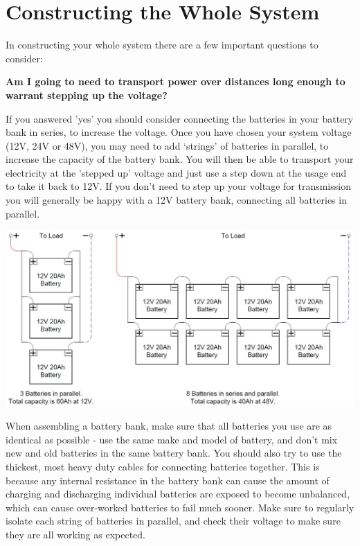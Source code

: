\documentclass{article}
\theoremstyle{definition}
\theoremstyle{definition}
\theoremstyle{remark}
\begin{document}


{\color{blue}\section{Constructing the Whole System}} %
\label{sec:constructing_the_whole_system}

  In constructing your whole system there are a few important questions to consider:

  \textbf{Am I going to need to transport power over distances long enough to warrant stepping up the voltage?}

  If you answered 'yes' you should consider connecting the batteries in your battery bank in series, to increase the voltage. Once you have chosen your system voltage (12V, 24V or 48V), you may need to add ‘strings’ of batteries in parallel, to increase the capacity of the battery bank. You will then be able to transport your electricity at the 'stepped up' voltage and just use a step down at the usage end to take it back to 12V. If you don't need to step up your voltage for transmission you will generally be happy with a 12V battery bank, connecting all batteries in parallel.

  \begin{center}
    \includegraphics[width=0.75\paperwidth]{Images/image_13_1_(whole_system_1).png}
  \end{center}

  When assembling a battery bank, make sure that all batteries you use are as identical as possible - use the same make and model of battery, and don’t mix new and old batteries in the same battery bank. You should also try to use the thickest, most heavy duty cables for connecting batteries together. This is because any internal resistance in the battery bank can cause the amount of charging and discharging individual batteries are exposed to become unbalanced, which can cause over-worked batteries to fail much sooner. Make sure to regularly isolate each string of batteries in parallel, and check their voltage to make sure they are all working as expected. 
\end{document}
